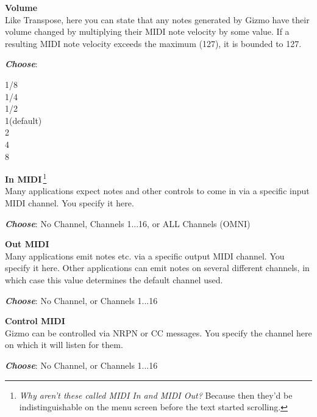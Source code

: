 \documentclass{article}
\begin{document}
\begin{description}
	\item{\bf  Volume}\\
		Like Transpose, here you can state that any notes generated by Gizmo have their volume changed by multiplying their MIDI note velocity by some value.  If a resulting MIDI note velocity exceeds the maximum (127), it is bounded to 127.
			
			
			\begin{description}
			\item{\bf \textit{Choose}}:
			\begin{tabbing}
			1/8\\
			1/4\\
			1/2\hspace{3.65in}\\
			1\qquad (default)\\
			2\\
			4\\
			8
			\end{tabbing}
		\end{description}

	\item{\bf In MIDI}\,\footnote{{\it Why aren't these called MIDI In and MIDI Out?}  Because then they'd be indistinguishable on the menu screen before the text started scrolling.}\\
		Many applications expect notes and other controls to come in via a specific input MIDI channel.  You specify it here.
		\begin{description}
		\item{\bf \textit{Choose}}: No Channel, Channels 1...16, or ALL Channels (OMNI)\hspace{0.25in}~\smash{\texttt{[image: all.pdf]}}
		\end{description}
	\item{\bf Out MIDI}\\
		Many applications emit notes etc. via a specific output MIDI channel.  You specify it here.  Other applications can emit notes on several different channels, in which case this value determines the default channel used.
		\begin{description}
		\item{\bf \textit{Choose}}: No Channel, or Channels 1...16\hspace{0.5in}\smash{\texttt{[image: none.pdf]}}
		\end{description}
	\item{\bf Control MIDI}\\
		Gizmo can be controlled via NRPN or CC messages.  You specify the channel here on which it will listen for them.
		\begin{description}
		\item{\bf \textit{Choose}}: No Channel, or Channels 1...16\hspace{0.5in}
		\end{description}
		

\end{description}
\end{document}
